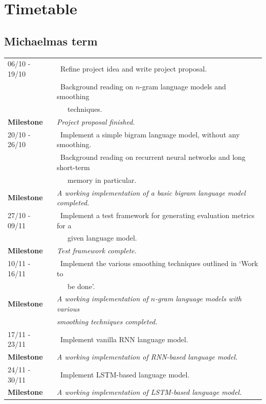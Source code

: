\documentclass[a4paper, 12pt]{article}
\newcommand{\tbf}[1]{\textbf{#1}}
\newcommand{\tit}[1]{\textit{#1}}
\newcommand{\bpt}[0]{\textbullet~}
\begin{document}
\newpage
\section*{Timetable}

\subsection*{Michaelmas term}
\begin{tabular}{l | l}
	06/10 - 19/10 & \bpt Refine project idea and write project proposal. \\
	& \bpt Background reading on $n$-gram language models and smoothing \\
	&~~~techniques. \\
	\tbf{Milestone} & \tit{Project proposal finished.} \\ \hline
	20/10 - 26/10 & \bpt Implement a simple bigram language model, without any smoothing. \\
	& \bpt Background reading on recurrent neural networks and long short-term \\
	&~~~memory in particular. \\
	\tbf{Milestone} & \tit{A working implementation of a basic bigram language model completed.} \\ \hline
	27/10 - 09/11 & \bpt Implement a test framework for generating evaluation metrics for a \\
	&~~~given language model. \\
	\tbf{Milestone} & \tit{Test framework complete.} \\ \hline
	10/11 - 16/11 & \bpt Implement the various smoothing techniques outlined in `Work to \\
	&~~~be done'. \\
	\tbf{Milestone} & \tit{A working implementation of $n$-gram language models with various} \\
	& \tit{smoothing techniques completed.} \\ \hline
	17/11 - 23/11 & \bpt Implement vanilla RNN language model. \\
	\tbf{Milestone} & \tit{A working implementation of RNN-based language model.} \\ \hline
	24/11 - 30/11 & \bpt Implement LSTM-based language model. \\
	\tbf{Milestone} & \tit{A working implementation of LSTM-based language model.} \\ \hline
\end{tabular}
\end{document}
